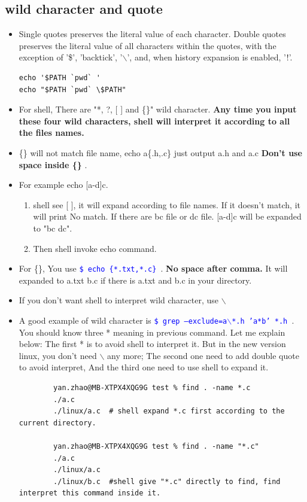 \documentclass[a4paper,11pt,twoside]{book}
\newcommand{\linuxcommand}[1]{\texttt{\textcolor{blue}{\$ #1 \Pisymbol{psy}{191}}}}
\begin{document}
\subsection{wild character and quote}
\begin{itemize}
		\item Single quotes preserves the literal value of each character.  Double quotes preserves the literal value of all characters within the quotes, with the exception of '\$', 'backtick', '$\backslash$', and, when history expansion is enabled, '!'. 
\begin{verbatim}
echo '$PATH `pwd` '
echo "$PATH `pwd` \$PATH"
\end{verbatim}
		\item For shell, There are "*, ?, [ ] and \{\}" wild character. \textbf{Any time you input these four wild characters, shell will interpret it according to all the files names.}

		\item \{\} will not match file name, echo a\{.h,.c\} just output a.h and a.c \textbf{Don't use space inside \{\} }.

		\item For example echo [a-d]c.  
				\begin{enumerate}
						\item shell see [ ], it will expand according to file names. If it doesn't match, it will print No match. If there are bc file or dc file. [a-d]c will be expanded to "bc dc".
						\item Then shell invoke echo command.
				\end{enumerate}

		\item For \{\}, You use \linuxcommand{echo \{*.txt,*.c\}}. \textbf{No space after comma.} It will expanded to a.txt b.c if there is a.txt and b.c in your directory.

		\item If you don't want shell to interpret wild character, use $\backslash$

		\item A good example of wild character is \linuxcommand{grep --exclude=a$\backslash$*.h 'a*b' *.h}. You should know three * meaning in previous command. Let me explain below: The first * is to avoid shell to interpret it. But in the new version linux, you don't need $\backslash$ any more; The second one need to add double quote to avoid interpret, And the third one need to use shell to expand it.  
		\begin{lstlisting}
		yan.zhao@MB-XTPX4XQG9G test % find . -name *.c
		./a.c
		./linux/a.c  # shell expand *.c first according to the current directory.
		
		yan.zhao@MB-XTPX4XQG9G test % find . -name "*.c"
		./a.c
		./linux/a.c
		./linux/b.c  #shell give "*.c" directly to find, find interpret this command inside it.
		\end{lstlisting}
		
\end{itemize}
\end{document}

